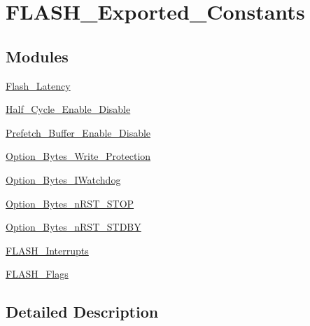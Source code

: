 \hypertarget{group___f_l_a_s_h___exported___constants}{}\section{F\+L\+A\+S\+H\+\_\+\+Exported\+\_\+\+Constants}
\label{group___f_l_a_s_h___exported___constants}
\subsection*{Modules}
\begin{DoxyCompactItemize}
\item 
\hyperlink{group___flash___latency}{Flash\+\_\+\+Latency}
\item 
\hyperlink{group___half___cycle___enable___disable}{Half\+\_\+\+Cycle\+\_\+\+Enable\+\_\+\+Disable}
\item 
\hyperlink{group___prefetch___buffer___enable___disable}{Prefetch\+\_\+\+Buffer\+\_\+\+Enable\+\_\+\+Disable}
\item 
\hyperlink{group___option___bytes___write___protection}{Option\+\_\+\+Bytes\+\_\+\+Write\+\_\+\+Protection}
\item 
\hyperlink{group___option___bytes___i_watchdog}{Option\+\_\+\+Bytes\+\_\+\+I\+Watchdog}
\item 
\hyperlink{group___option___bytes__n_r_s_t___s_t_o_p}{Option\+\_\+\+Bytes\+\_\+n\+R\+S\+T\+\_\+\+S\+T\+OP}
\item 
\hyperlink{group___option___bytes__n_r_s_t___s_t_d_b_y}{Option\+\_\+\+Bytes\+\_\+n\+R\+S\+T\+\_\+\+S\+T\+D\+BY}
\item 
\hyperlink{group___f_l_a_s_h___interrupts}{F\+L\+A\+S\+H\+\_\+\+Interrupts}
\item 
\hyperlink{group___f_l_a_s_h___flags}{F\+L\+A\+S\+H\+\_\+\+Flags}
\end{DoxyCompactItemize}


\subsection{Detailed Description}
